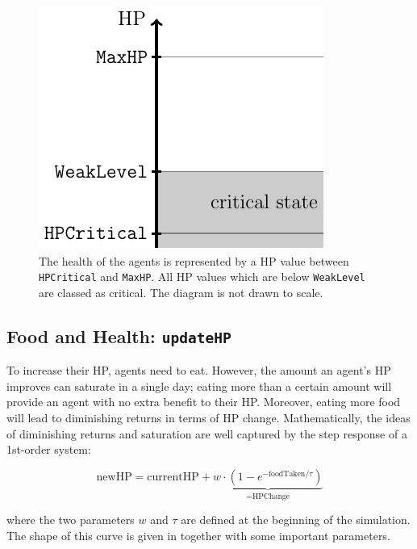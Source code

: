\begin{figure}[htb]
    \centering
    \includegraphics[width=0.3\linewidth]{002_simulation_structure/images/health_global.pdf}
    \caption{The health of the agents is represented by a HP value between \lstinline$HPCritical$ and \lstinline$MaxHP$. All HP values which are below \lstinline$WeakLevel$ are classed as critical. The diagram is not drawn to scale.}
    \label{fig:health_system}
\end{figure}

\subsection{Food and Health: \lstinline$updateHP$}\label{updateHP}
To increase their HP, agents need to eat. However, the amount an agent's HP improves can saturate in a single day; eating more than a certain amount will provide an agent with no extra benefit to their HP. Moreover, eating more food will lead to diminishing returns in terms of HP change. Mathematically, the ideas of diminishing returns and saturation are well captured by the step response of a 1st-order system:

\begin{equation}\label{updateHP_general}
   \text{newHP}= \text{currentHP} +\underbrace{w\cdot(1-e^{-\text{foodTaken}/ \tau})}_{=\text{HPChange}}
\end{equation}

where the two parameters $w$ and $\tau$ are defined at the beginning of the simulation. The shape of this curve is given in  together with some important parameters.

